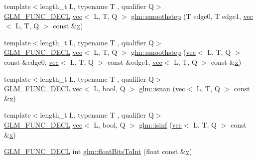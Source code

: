\begin{DoxyCompactItemize}
\item 
{\footnotesize template$<$length\+\_\+t L, typename T , qualifier Q$>$ }\\\hyperlink{setup_8hpp_ab2d052de21a70539923e9bcbf6e83a51}{G\+L\+M\+\_\+\+F\+U\+N\+C\+\_\+\+D\+E\+CL} \hyperlink{structglm_1_1vec}{vec}$<$ L, T, Q $>$ \hyperlink{group__core__func__common_gade789a876643ff09880a2714d398b06f}{glm\+::smoothstep} (T edge0, T edge1, \hyperlink{structglm_1_1vec}{vec}$<$ L, T, Q $>$ const \&\hyperlink{_s_d_l__opengl_8h_ad0e63d0edcdbd3d79554076bf309fd47}{x})
\item 
{\footnotesize template$<$length\+\_\+t L, typename T , qualifier Q$>$ }\\\hyperlink{setup_8hpp_ab2d052de21a70539923e9bcbf6e83a51}{G\+L\+M\+\_\+\+F\+U\+N\+C\+\_\+\+D\+E\+CL} \hyperlink{structglm_1_1vec}{vec}$<$ L, T, Q $>$ \hyperlink{group__core__func__common_ga86a29708af325a4cd7d75cf5bdc8c3f8}{glm\+::smoothstep} (\hyperlink{structglm_1_1vec}{vec}$<$ L, T, Q $>$ const \&edge0, \hyperlink{structglm_1_1vec}{vec}$<$ L, T, Q $>$ const \&edge1, \hyperlink{structglm_1_1vec}{vec}$<$ L, T, Q $>$ const \&\hyperlink{_s_d_l__opengl_8h_ad0e63d0edcdbd3d79554076bf309fd47}{x})
\item 
{\footnotesize template$<$length\+\_\+t L, typename T , qualifier Q$>$ }\\\hyperlink{setup_8hpp_ab2d052de21a70539923e9bcbf6e83a51}{G\+L\+M\+\_\+\+F\+U\+N\+C\+\_\+\+D\+E\+CL} \hyperlink{structglm_1_1vec}{vec}$<$ L, bool, Q $>$ \hyperlink{group__core__func__common_ga29ef934c00306490de837b4746b4e14d}{glm\+::isnan} (\hyperlink{structglm_1_1vec}{vec}$<$ L, T, Q $>$ const \&\hyperlink{_s_d_l__opengl_8h_ad0e63d0edcdbd3d79554076bf309fd47}{x})
\item 
{\footnotesize template$<$length\+\_\+t L, typename T , qualifier Q$>$ }\\\hyperlink{setup_8hpp_ab2d052de21a70539923e9bcbf6e83a51}{G\+L\+M\+\_\+\+F\+U\+N\+C\+\_\+\+D\+E\+CL} \hyperlink{structglm_1_1vec}{vec}$<$ L, bool, Q $>$ \hyperlink{group__core__func__common_ga2885587c23a106301f20443896365b62}{glm\+::isinf} (\hyperlink{structglm_1_1vec}{vec}$<$ L, T, Q $>$ const \&\hyperlink{_s_d_l__opengl_8h_ad0e63d0edcdbd3d79554076bf309fd47}{x})
\item 
\hyperlink{setup_8hpp_ab2d052de21a70539923e9bcbf6e83a51}{G\+L\+M\+\_\+\+F\+U\+N\+C\+\_\+\+D\+E\+CL} int \hyperlink{group__core__func__common_gadc6a536a7bef046c3293d2ccad6d9ca2}{glm\+::float\+Bits\+To\+Int} (float const \&\hyperlink{_s_d_l__opengl_8h_a10a82eabcb59d2fcd74acee063775f90}{v})
\item 

\end{DoxyCompactItemize}
